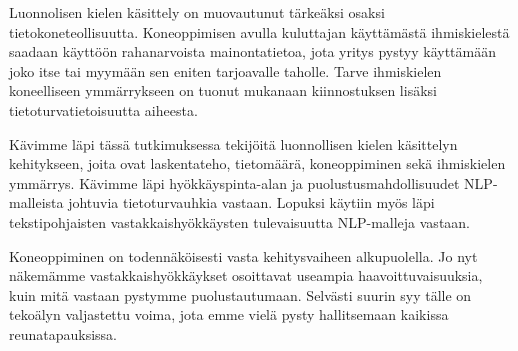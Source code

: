 Luonnolisen kielen käsittely on muovautunut tärkeäksi osaksi tietokoneteollisuutta. Koneoppimisen avulla kuluttajan käyttämästä ihmiskielestä saadaan käyttöön rahanarvoista mainontatietoa, jota yritys pystyy käyttämään joko itse tai myymään sen eniten tarjoavalle taholle. Tarve ihmiskielen koneelliseen ymmärrykseen on tuonut mukanaan kiinnostuksen lisäksi tietoturvatietoisuutta aiheesta.

Kävimme läpi tässä tutkimuksessa tekijöitä luonnollisen kielen käsittelyn kehitykseen, joita ovat laskentateho, tietomäärä, koneoppiminen sekä ihmiskielen ymmärrys. Kävimme läpi hyökkäyspinta-alan ja puolustusmahdollisuudet NLP-malleista johtuvia tietoturvauhkia vastaan. Lopuksi käytiin myös läpi tekstipohjaisten vastakkaishyökkäysten tulevaisuutta NLP-malleja vastaan.

Koneoppiminen on todennäköisesti vasta kehitysvaiheen alkupuolella. Jo nyt näkemämme vastakkaishyökkäykset osoittavat useampia haavoittuvaisuuksia, kuin mitä vastaan pystymme puolustautumaan. Selvästi suurin syy tälle on tekoälyn valjastettu voima, jota emme vielä pysty hallitsemaan kaikissa reunatapauksissa.